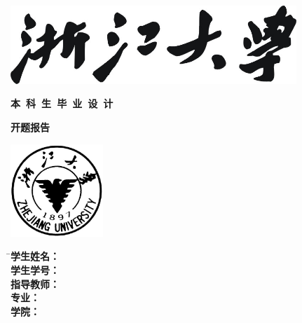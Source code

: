 
\thispagestyle{empty}

\vspace{5mm}

\begin{center}
    \includegraphics[width=108mm]{images/zjdx}
\end{center}

\centerline{\heiti\erhao\textbf{本~科~生~毕~业~设~计}}
\centerline{\heiti\erhao\textbf{开题报告}}
\vspace{4mm}

\begin{center}
    \includegraphics[width=35mm]{images/standxb}
\end{center}

\vspace{32mm}

\begin{tabbing}
    \hspace{30mm} 
    \= \songti\sanhao \textbf{学生姓名：} \= \underline{\makebox[6cm]{\sanhao\textbf{\zjuauthornamec}}} \\[2mm]
    \> \songti\sanhao \textbf{学生学号：} \> \underline{\makebox[6cm]{\sanhao\textbf{\zjuauthorid}}} \\[2mm]
    \> \songti\sanhao \textbf{指导教师：} \> \underline{\makebox[6cm]{\sanhao\textbf{\zjumentorc}}} \\[2mm]
    \> \songti\sanhao \textbf{专\hspace{10mm}业：} \> \underline{\makebox[6cm]{\sanhao\textbf{\zjumajor}}} \\[2mm]
    \> \songti\sanhao \textbf{学\hspace{10mm}院：} \> \underline{\makebox[6cm]{\sanhao\textbf{\zjucollegec}}}
\end{tabbing}

